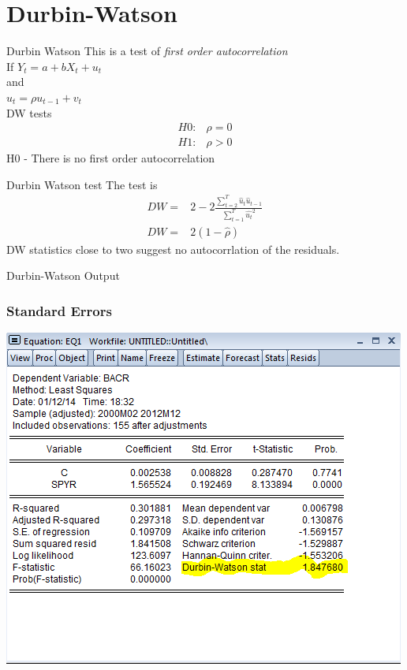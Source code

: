 \documentclass[14pt,xcolor=pdftex,dvipsnames,table]{beamer}\usepackage{graphicx, color}
\begin{document}
\section{Durbin-Watson}
\begin{frame}{Durbin Watson}
This is a test of \emph{first order autocorrelation}\\
If 
$Y_t = a + b X_t + u_t$\\
and \\
$u_t = \rho u_{t-1} + v_t$\\
DW tests 
\begin{align*}
H0:& \rho = 0\\
H1:& \rho > 0
\end{align*}
H0 - There is no first order autocorrelation
\end{frame}

\begin{frame}{Durbin Watson test}
The test is 
\begin{align*}
DW =& 2 - 2 \frac{\sum_{t = 2}^T \hat{u}_t \hat{u}_{t-1}}{\sum_{t=1}^T \hat{u_t}^2}\\
DW =& 2(1 - \hat{\rho})
\end{align*}
DW statistics close to two suggest no autocorrlation of the residuals.
\end{frame}

\begin{frame}{Durbin-Watson Output}
\graphicspath{{./Figures/}}
\frametitle{Standard Errors}
\begin{center}
\includegraphics[height = 3 in]{DW}
\end{center}
\end{frame}
\end{document}
